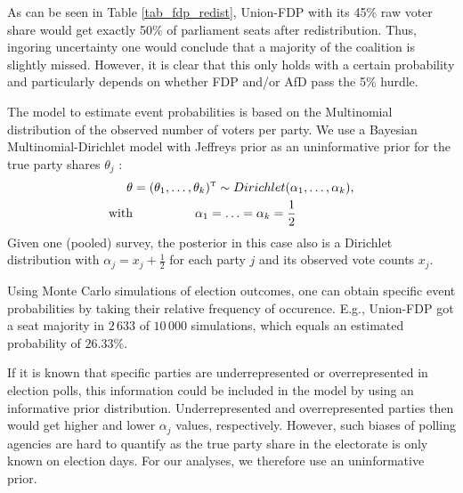 \documentclass[smallcondensed]{svjour3}     %
\newcommand{\T}{\mathrm{\scriptscriptstyle T}}
\begin{document}
As can be seen in Table \ref{tab_fdp_redist}, Union-FDP with its 45\% raw voter share would get exactly 50\% of parliament seats after redistribution. Thus, ingoring uncertainty one would conclude that a majority of the coalition is slightly missed. However, it is clear that this only holds with a certain probability and particularly depends on whether FDP and/or AfD pass the 5\% hurdle.

The model to estimate event probabilities is based on the Multinomial distribution of the observed
number of voters per party. We use a Bayesian Multinomial-Dirichlet model
with Jeffreys prior as an uninformative prior for the true party shares
$\theta_j$ \citep{gelman_2013}:
\begin{equation}
\begin{aligned}
\boldmath{\theta} &= (\theta_1,\ldots,\theta_k)^\T \sim Dirichlet(\alpha_1,\ldots,\alpha_k), \\
\text{with} &\ \ \ \ \ \ \ \ \ \ \ \ \ \ \ \alpha_1 = \ldots = \alpha_k = \frac{1}{2}
\end{aligned}
\end{equation}
Given one (pooled) survey, the posterior in this case also is a Dirichlet distribution
with $\alpha_j = x_j + \frac{1}{2}$ for each party $j$ and its observed
vote counts $x_j$.

Using Monte Carlo simulations of election outcomes, one can obtain
specific event probabilities by taking their relative frequency of
occurence. E.g., Union-FDP got a seat majority
in $2\,633$ of $10\,000$ simulations, which equals an estimated 
probability of $26.33\%$.

If it is known that specific parties are underrepresented or
overrepresented in election polls, this information
could be included in the model by using an informative prior distribution.
Underrepresented and overrepresented parties then would get higher and lower
$\alpha_j$ values, respectively.
However, such biases of polling agencies are hard to quantify
as the true party share in the electorate is only known on election days.
For our analyses, we therefore use an uninformative prior.
\end{document}
